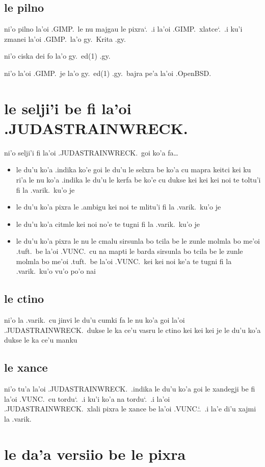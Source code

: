 \documentclass{report}
\newcommand\sds{\spacefactor\sfcode`.\ \space}
\begin{document}
\subsection{le pilno}
ni'o pilno la'oi .GIMP.\ le nu majgau le pixra\sds  .i  la'oi .GIMP.\ xlatce\sds  .i ku'i zmanei la'oi .GIMP.\ la'o gy.\ Krita  .gy.

ni'o ciska dei fo la'o gy.\ ed(1) .gy.

ni'o la'oi .GIMP.\ je la'o gy.\ ed(1) .gy.\ bajra pe'a la'oi .OpenBSD.

\section{le selji'i be fi la'oi .JUDASTRAINWRECK.}
ni'o selji'i fi la'oi .JUDASTRAINWRECK.\ goi ko'a fa\ldots
\begin{itemize}
	\item le du'u ko'a .indika ko'e goi le du'u le selxra be ko'a cu mapra keitci kei ku ri'a le nu ko'a .indika le du'u le kerfa be ko'e cu dukse kei kei kei noi te toltu'i fi la .varik.\ ku'o je
	\item le du'u ko'a pixra le .ambigu kei noi te mlitu'i fi la .varik.\ ku'o je
	\item le du'u ko'a citmle kei noi no'e te tugni fi la .varik.\ ku'o je
	\item le du'u ko'a pixra le nu le cmalu sirsunla bo tcila be le zunle molmla bo me'oi .tuft.\ be la'oi .VUNC.\ cu na mapti le barda sirsunla bo tcila be le zunle molmla bo me'oi .tuft.\ be la'oi .VUNC.\ kei kei noi ke'a te tugni fi la .varik.\ ku'o
vu'o po'o nai
\end{itemize}

\subsection{le ctino}
ni'o la .varik.\ cu jinvi le du'u cumki fa le nu ko'a goi la'oi .JUDASTRAINWRECK.\ dukse le ka ce'u vasru le ctino kei kei kei je le du'u ko'a dukse le ka ce'u manku

\subsection{le xance}
ni'o tu'a la'oi .JUDASTRAINWRECK.\ .indika le du'u ko'a goi le xandegji be fi la'oi .VUNC.\ cu tordu\sds  .i ku'i ko'a na tordu\sds  .i la'oi .JUDASTRAINWRECK.\ xlali pixra le xance be la'oi .VUNC.\sds  .i la'e di'u xajmi la .varik.

\section{le da'a versiio be le pixra}
\end{document}
